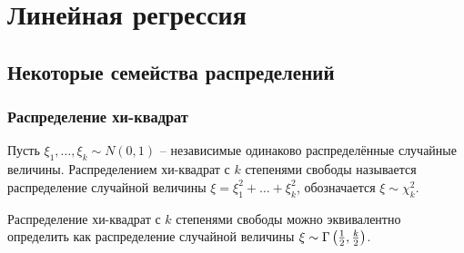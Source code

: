 \section{Линейная регрессия}

\subsection{Некоторые семейства распределений}

\subsubsection{Распределение хи-квадрат}

\begin{definition}
    Пусть $\xi_1, \dots, \xi_k \sim N(0, 1)$ -- независимые одинаково распределённые случайные величины. Распределением хи-квадрат с $k$ степенями свободы называется распределение случайной величины $\xi = \xi_1^2 + \dots + \xi_k^2$, обозначается $\xi \sim \chi^2_k$.
\end{definition}

\begin{proposition}
    Распределение хи-квадрат с $k$ степенями свободы можно эквивалентно определить как распределение случайной величины $\xi \sim \Gamma\left(\frac{1}{2}, \frac{k}{2}\right)$.
\end{proposition}

